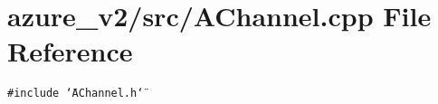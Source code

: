 \section{azure\_\-v2/src/AChannel.cpp File Reference}
\label{AChannel_8cpp}
{\tt \#include \char`\"{}AChannel.h\char`\"{}}\par
